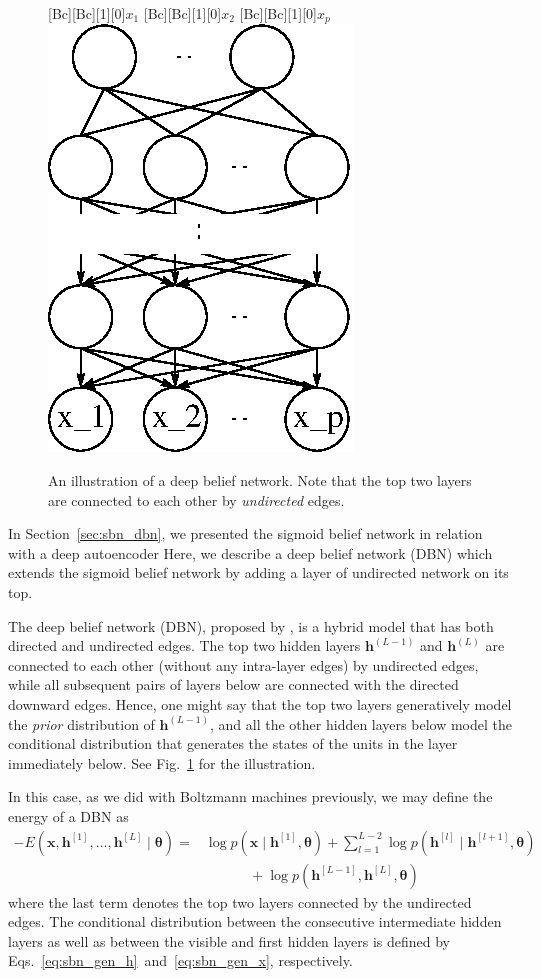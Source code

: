 \documentclass[dissertation,nocontribution]{aaltoseries}
\newcommand{\qlay}[1]{\left[#1\right]}
\newcommand{\vect}[1]{\mathbf{#1}}
\newcommand{\vects}[1]{\boldsymbol{#1}}
\newcommand{\vh}[0]{\vect{h}}
\newcommand{\vx}[0]{\vect{x}}
\newcommand{\TT}[0]{{\vects{\theta}}}
\begin{document}
\begin{figure}
    \centering
    [Bc][Bc][1][0]{$x_1$}
    [Bc][Bc][1][0]{$x_2$}
    [Bc][Bc][1][0]{$x_p$}
    \includegraphics[width=0.27\columnwidth]{figures/dbn.eps}
    \caption{An illustration of a deep belief network. Note
    that the top two layers are connected to each other by
    \textit{undirected} edges.}
    \label{fig:dbn}
    \vspace{-2mm}
\end{figure}

In Section~\ref{sec:sbn_dbn}, we presented the sigmoid belief
network in relation with a deep autoencoder
Here, we describe a deep belief network
(DBN) \citep{Hinton2006nc}
which extends the sigmoid belief network by adding a layer of
undirected network on its top. 

The deep belief network (DBN), proposed by
\citet{Hinton2006nc}, is a hybrid model that has both
directed and undirected edges.  The top two hidden layers
$\vh^{(L-1)}$ and $\vh^{(L)}$ are connected to each other 
(without any intra-layer edges) by undirected edges,
while all subsequent pairs of layers below are connected
with the directed downward edges. Hence, one might say that
the top two layers generatively model the \textit{prior}
distribution of $\vh^{(L-1)}$, and all the other hidden layers
below model the conditional distribution that generates the
states of the units in the layer immediately below. See
Fig.~\ref{fig:dbn} for the illustration.

In this case, as we did with Boltzmann machines previously,
we may define the energy of a DBN as
\begin{align}
    \label{eq:dbn_energy}
    -E(\vx, \vh^{\qlay{1}}, \dots, \vh^{\qlay{L}} \mid \TT)
    = 
    &\log p(\vx \mid \vh^{\qlay{1}}, \TT) + \sum_{l=1}^{L-2} \log
    p(\vh^{\qlay{l}} \mid \vh^{\qlay{l+1}}, \TT) 
    \nonumber \\
    &\phantom{= \log}+\log p(\vh^{\qlay{L-1}}, \vh^{\qlay{L}}, \TT) 
\end{align}
where the last term denotes the top two layers connected by
the undirected edges. The conditional distribution between
the consecutive intermediate hidden layers as well as between
the visible and first hidden layers is defined by
Eqs.~\eqref{eq:sbn_gen_h}~and~\eqref{eq:sbn_gen_x},
respectively.
\end{document}
